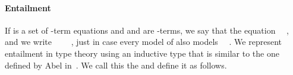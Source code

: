 \paragraph*{Entailment}

If  is a set of -term equations and  and  are -terms,
we say that   the equation ~~, and we write
~~~~, just in case every model of  also models
~~.
We represent entailment in type theory using an inductive type that is similar to
the one defined by Abel in~\cite{Abel:2021}.  We call this the 
and define it as follows.

\begin{code}%
\>[0]\<%
\\
\>[0]\AgdaSpace{}%
%
\>[14]\AgdaSymbol{(}\AgdaSpace{}%
\AgdaSymbol{:}\AgdaSpace{}%
\AgdaSymbol{\{}\AgdaSpace{}%
\AgdaSymbol{:}\AgdaSpace{}%
\AgdaSpace{}%
\AgdaSymbol{\}}\AgdaSpace{}%
\AgdaSpace{}%
\AgdaSymbol{(}\AgdaSpace{}%
\AgdaSpace{}%
\AgdaSpace{}%
\AgdaSpace{}%
\AgdaSymbol{)}\AgdaSpace{}%
\AgdaSymbol{(}\AgdaSpace{}%
\AgdaSymbol{))}\AgdaSpace{}%
\AgdaSymbol{:}\<%
\\
%
\>[14]\AgdaSymbol{(}\AgdaSpace{}%
\AgdaSymbol{:}\AgdaSpace{}%
\AgdaSpace{}%
\AgdaSymbol{)(}\AgdaSpace{}%
\AgdaSpace{}%
\AgdaSymbol{:}\AgdaSpace{}%
\AgdaSpace{}%
\AgdaSymbol{)}\AgdaSpace{}%
\AgdaSpace{}%
\AgdaSpace{}%
\AgdaSymbol{(}\AgdaSpace{}%
\AgdaSymbol{)}\AgdaSpace{}%
\<%
\\
%
\\[\AgdaEmptyExtraSkip]%
\>[0][@{}l@{\AgdaIndent{0}}]%
\>[1]%
\>[13]\AgdaSymbol{:}%
\>[16]\AgdaSymbol{\}\{}\AgdaSpace{}%
\AgdaSpace{}%
\AgdaSymbol{:}\AgdaSpace{}%
\AgdaSpace{}%
\AgdaSymbol{\}}\AgdaSpace{}%
\AgdaSpace{}%
\AgdaSymbol{(}\AgdaSpace{}%
\AgdaOperator{\AgdaInductiveConstructor{,}}\AgdaSpace{}%

\end{code}
